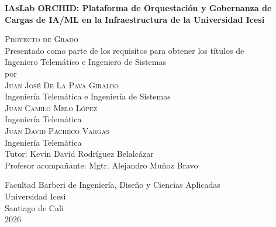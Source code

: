 \documentclass[letterpaper,11pt]{report}
\begin{document}
\begin{titlepage}
\begin{center}

\doublespacing
{\Huge \textbf{IAsLab ORCHID: Plataforma de Orquestación y Gobernanza de Cargas de IA/ML en la Infraestructura de la Universidad Icesi}}\\[3cm]

\singlespacing

\textsc{\Large Proyecto de Grado}\\[1cm]

Presentado como parte de los requisitos para obtener los títulos de \\
Ingeniero Telemático e Ingeniero de Sistemas \\[2cm]

por \\[0.5cm]

\textsc{\Large Juan José De La Pava Giraldo}\\
{\normalsize Ingeniería Telemática e Ingeniería de Sistemas}\\[0.4cm]
\textsc{\Large Juan Camilo Melo López}\\
{\normalsize Ingeniería Telemática}\\[0.4cm]
\textsc{\Large Juan David Pacheco Vargas}\\
{\normalsize Ingeniería Telemática}\\[1cm]

\large{Tutor:} Kevin David Rodríguez Belalcázar \\
\large{Profesor acompañante:} Mgtr. Alejandro Muñoz Bravo \\

\vfill

{\Large Facultad Barberi de Ingeniería, Diseño y Ciencias Aplicadas}\\[0.5cm]

\large Universidad Icesi\\
\large Santiago de Cali\\
\large 2026\\

\end{center}
\end{titlepage}


\setlength{\cftparskip}{0pt}
\setlength{\cftbeforesecskip}{0.2em}
\tableofcontents
\pagebreak

\listoftables
\pagebreak
\end{document}
